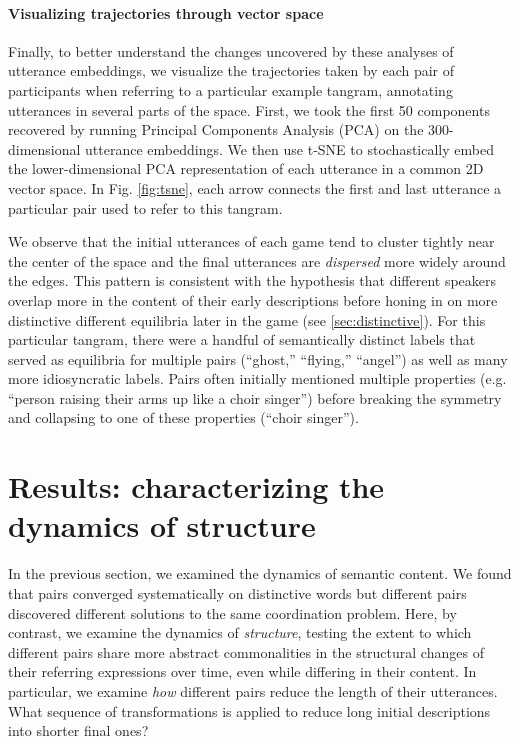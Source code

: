 \documentclass[alpha-refs]{wiley-article}
\begin{document}
\paragraph{Visualizing trajectories through vector space}  
Finally, to better understand the changes uncovered by these analyses of utterance embeddings, we visualize the trajectories taken by each pair of participants when referring to a particular example tangram, annotating utterances in several parts of the space.
First, we took the first 50 components recovered by running Principal Components Analysis (PCA) on the 300-dimensional utterance embeddings. 
We then use t-SNE \citep{maaten2008visualizing} to stochastically embed the lower-dimensional PCA representation of each utterance in a common 2D vector space. 
In Fig. \ref{fig:tsne}, each arrow connects the first and last utterance a particular pair used to refer to this tangram.

We observe that the initial utterances of each game tend to cluster tightly near the center of the space and the final utterances are \emph{dispersed} more widely around the edges. 
This pattern is consistent with the hypothesis that different speakers overlap more in the content of their early descriptions before honing in on more distinctive different equilibria later in the game  (see \ref{sec:distinctive}). 
For this particular tangram, there were a handful of semantically distinct labels that served as equilibria for multiple pairs (``ghost,'' ``flying,'' ``angel'') as well as many more idiosyncratic labels.
Pairs often initially mentioned multiple properties (e.g. ``person raising their arms up like a choir singer'') before breaking the symmetry and collapsing to one of these properties (``choir singer'').


\section{Results: characterizing the dynamics of structure}
\label{sec:structure}

In the previous section, we examined the dynamics of semantic content.
We found that pairs converged systematically on distinctive words but different pairs discovered different solutions to the same coordination problem. 
Here, by contrast, we examine the dynamics of \emph{structure}, testing the extent to which different pairs share more abstract commonalities in the structural changes of their referring expressions over time, even while differing in their content. 
In particular, we examine \emph{how} different pairs reduce the length of their utterances.
What sequence of transformations is applied to reduce long initial descriptions into shorter final ones?
\end{document}
